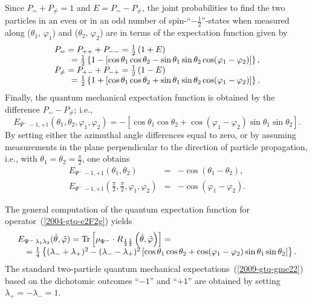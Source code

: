 {Since $P_= + P_{\neq} = 1$ and $E= P_= - P_{\neq}$, the joint probabilities to find the two particles
in an even or in an odd number of
spin-``$-\frac{1}{2}$''-states when measured along
($\theta_1$, $\varphi_1 $) and
($\theta_2$, $\varphi_2 $)
are in terms of the expectation function given by
\begin{equation}
\begin{array}{l}
P_= = P_{++}+P_{--} =
{1\over2}\left(1 + E  \right)   \\
\qquad =\frac{1}{2} \left\{ 1- \left[\cos \theta_1 \cos \theta_2 - \sin \theta_1 \sin \theta_2 \cos (\varphi_1-\varphi_2) \right]\right\}
,
\\
P_{\neq} = P_{+-}+P_{-+} =
{1\over2}\left(1 - E \right)  \\
\qquad =\frac{1}{2} \left\{ 1+ \left[\cos \theta_1 \cos \theta_2 + \sin \theta_1 \sin \theta_2 \cos (\varphi_1-\varphi_2) \right]\right\}
.
\end{array}
\end{equation}
Finally, the quantum mechanical expectation function is obtained by  the difference $P_= -P_{\neq }$; i.e.,
\begin{equation}
E_{{ {\Psi^-}}\,-1,+1  }(\theta_1,\theta_2,\varphi_1 , \varphi_2)=
-\left[\cos \theta_1 \cos \theta_2 + \cos (\varphi_1 - \varphi_2) \sin \theta_1 \sin \theta_2\right]
.
\label{2009-gtq-gme22}
\end{equation}
By setting either the azimuthal angle differences equal to zero,
or by assuming measurements in the plane perpendicular to the direction of particle propagation,
i.e., with $\theta_1=\theta_2 =\frac{\pi}{2}$,
one obtains
\begin{equation}
\label{2009-gtq-edosgc}
\begin{array}{rcl}
E_{{ {\Psi^-}}\,-1,+1  }(\theta_1,\theta_2)&=& -\cos (\theta_1 - \theta_2),\\
E_{{ {\Psi^-}}\,-1,+1  }(\frac{\pi}{2},\frac{\pi}{2},\varphi_1 , \varphi_2) &=& - \cos (\varphi_1 - \varphi_2).
\end{array}
\end{equation}


The general computation of the quantum expectation function for operator~(\ref{2004-gtq-e2F2g})
yields
\begin{equation}
\begin{array}{l}
E_{{ {\Psi^-}}\,\lambda_1 \lambda_2 } ({\hat \theta},{\hat \varphi} )=
{\rm Tr}\left[\rho_{ {\Psi^-}} \cdot R_{\frac{1}{2}\frac{1}{2} } \left({\hat \theta},{\hat \varphi} \right)\right] =\\
\quad  =
\frac{1}{4} \left\{( \lambda_- + \lambda_+ )^2-( \lambda_- - \lambda_+ )^2 \left[\cos
    \theta_1  \cos  \theta_2 +\cos ( \varphi_1 - \varphi_2 ) \sin
    \theta_1  \sin  \theta_2 \right]\right\}.
\end{array}
\end{equation}
The standard two-particle quantum mechanical expectations~(\ref{2009-gtq-gme22}) based on the dichotomic outcomes
``$-1$''
and
``$+1$''
are obtained by setting
$  \lambda_+ = -  \lambda_- =1$.

}
